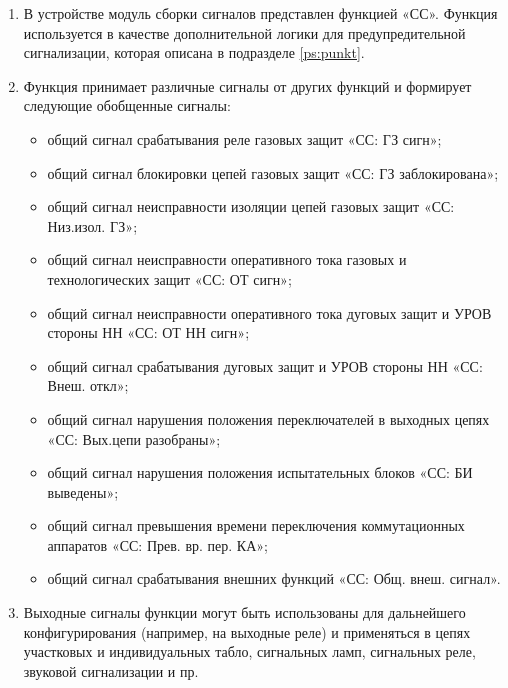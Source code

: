 
\color{black}

\begin{enumerate}
\item
В устройстве модуль сборки сигналов представлен функцией «СС». Функция используется в качестве дополнительной логики для предупредительной сигнализации, которая описана в подразделе \ref{ps:punkt}.

\item
Функция принимает различные сигналы от других функций и формирует следующие обобщенные сигналы:
\begin{itemize}
	\item общий сигнал срабатывания реле газовых защит «СС: ГЗ сигн»;
	\item общий сигнал блокировки цепей газовых защит «СС: ГЗ заблокирована»;
	\item общий сигнал неисправности изоляции цепей газовых защит «СС: Низ.изол. ГЗ»;	
	\item общий сигнал неисправности оперативного тока газовых и технологических защит «СС: ОТ сигн»;	
	\item общий сигнал неисправности оперативного тока дуговых защит и УРОВ стороны НН «СС: ОТ НН сигн»;
	\item общий сигнал срабатывания дуговых защит и УРОВ стороны НН «СС: Внеш. откл»;
	\item общий сигнал нарушения положения переключателей в выходных цепях  «СС: Вых.цепи разобраны»;
	\item общий сигнал нарушения положения испытательных блоков «СС: БИ выведены»;
	\item общий сигнал превышения времени переключения коммутационных аппаратов «СС: Прев. вр. пер. КА»;
	\item общий сигнал срабатывания внешних функций «СС: Общ. внеш. сигнал».
\end{itemize}

\item
Выходные сигналы функции могут быть использованы для дальнейшего конфигурирования (например, на выходные реле) и применяться в цепях участковых и индивидуальных табло, сигнальных ламп, сигнальных реле, звуковой сигнализации и пр.


\end{enumerate}

